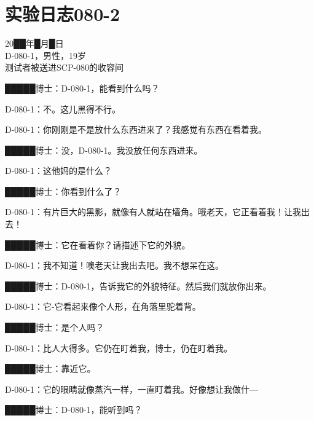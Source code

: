 \section{实验日志080-2}

\label{sec:DOC-experiment-log-080-2}


20██年█月█日\\
D-080-1，男性，19岁\\
测试者被送进SCP-080的收容间\\


\begin{scpbox}


█████博士：D-080-1，能看到什么吗？

D-080-1：不。这儿黑得不行。


D-080-1：你刚刚是不是放什么东西进来了？我感觉有东西在看着我。

█████博士：没，D-080-1。我没放任何东西进来。

D-080-1：这他妈的是什么？

█████博士：你看到什么了？

D-080-1：有片巨大的黑影，就像有人就站在墙角。哦老天，它正看着我！让我出去！

█████博士：它在看着你？请描述下它的外貌。

D-080-1：我不知道！噢老天让我出去吧。我不想呆在这。

█████博士：D-080-1，告诉我它的外貌特征。然后我们就放你出来。

D-080-1：它-它看起来像个人形，在角落里驼着背。

█████博士：是个人吗？

D-080-1：比人大得多。它仍在盯着我，博士，仍在盯着我。

█████博士：靠近它。


D-080-1：它的眼睛就像蒸汽一样，一直盯着我。好像想让我做什—

█████博士：D-080-1，能听到吗？



\end{scpbox}

